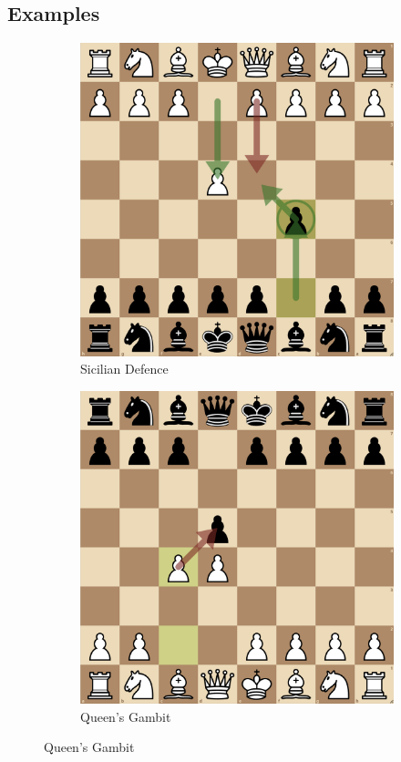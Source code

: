 \documentclass[a4paper, 11pt]{article}
\begin{document}
\begin{appendices}
\section{Examples}
\begin{figure}[H]
    \centering
    \caption{Examples of Chess Openings}
    \label{fig:examplesOfChessOpenings}
    \begin{subfigure}{0.49\textwidth}
        \centering
        \caption{Sicilian Defence}
        \includegraphics[width=\textwidth]{Example of Sicilian Defence.png}
    \end{subfigure}
    \hfill
    \begin{subfigure}{0.49\textwidth}
        \centering
        \caption{Queen's Gambit}
        \includegraphics[width=\textwidth]{Example of Queen's Gambit.png}

\end{subfigure}
\end{figure}
\end{appendices}
\end{document}
